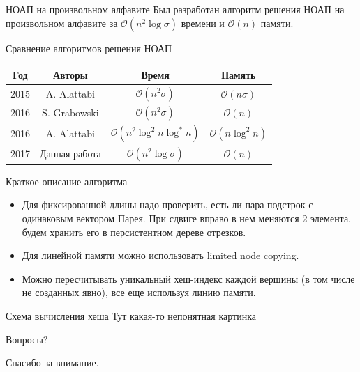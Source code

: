 \documentclass[hyperref=unicode,graphics=pdflatex,12pt]{beamer}
\begin{document}
\begin{frame}{НОАП на произвольном алфавите}
Был разработан алгоритм решения НОАП на произвольном алфавите
за $\mathcal{O}(n^2 \log \sigma)$ времени и $\mathcal{O}(n)$ памяти.

\vspace{0.5cm}

Сравнение алгоритмов решения НОАП

\begin{center}
\begin{tabular}{|c|c|c|c|}
\hline
Год & Авторы & Время & Память \\
\hline
2015 & A. Alattabi & $\mathcal{O}(n^2 \sigma)$ & $\mathcal{O}(n \sigma)$ \\
\hline
2016 & S. Grabowski & $\mathcal{O}(n^2 \sigma)$ & $\mathcal{O}(n)$ \\
\hline
2016 & A. Alattabi & $\mathcal{O}(n^2 \log^2 n \log^* n)$ & $\mathcal{O}(n \log^2 n)$ \\
\hline
2017 & Данная работа & $\mathcal{O}(n^2 \log \sigma)$ & $\mathcal{O}(n)$ \\
\hline
\end{tabular}
\end{center}
\end{frame}
      
\begin{frame}{Краткое описание алгоритма}
\vspace{0.5cm}
\hspace{0.5cm}
\begin{itemize}
\item Для фиксированной длины надо проверить, есть ли пара подстрок с одинаковым вектором Парея. При сдвиге вправо в нем меняются 2 элемента, будем хранить его в персистентном дереве отрезков.
\item<2-> Для линейной памяти можно использовать limited node copying.
\item<3-> Можно пересчитывать уникальный хеш-индекс каждой вершины (в том числе не созданных явно), все еще используя линию памяти.
\end{itemize}
\end{frame}

\begin{frame}{Схема вычисления хеша}
Тут какая-то непонятная картинка
\end{frame}

\begin{frame}{Вопросы?}
\begin{center}
Спасибо за внимание.
\end{center}
\end{frame}
\end{document}
